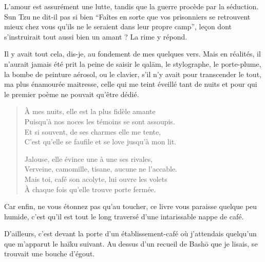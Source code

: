 {  L’amour est assurément une lutte, tandis que la guerre procède par la séduction. Sun Tzu ne dit-il pas si bien \enquote{Faîtes en sorte que vos prisonniers se retrouvent mieux chez vous qu’ils ne le seraient dans leur propre camp}, leçon dont s’instruirait tout aussi bien un amant ? La rime y répond.

  Il y avait tout cela, dis-je, au fondement de mes quelques vers. Mais en réalités, il n’aurait jamais été prit la peine de saisir le qalām, le stylographe, le porte-plume, la bombe de peinture aérosol, ou le clavier, s’il n’y avait pour transcender le tout, ma plus énamourée maitresse, celle qui me teint éveillé tant de nuits et pour qui le premier poème ne pouvait qu’être dédié.
}

\begin{verse}\quatrain
  À mes nuits, elle est la plus fidèle amante\\ 
  Puisqu’à nos noces les témoins se sont assoupis.\\ 
  Et si souvent, de ses charmes elle me tente,\\ 
  C’est qu’elle se faufile et se love jusqu’à mon lit. 

  Jalouse, elle évince une à une ses rivales,\\ 
  Verveine, camomille, tisane, aucune ne l’accable.\\ 
  Mais toi, café son acolyte, lui ouvre les volets\\ 
  À chaque fois qu’elle trouve porte fermée.  %
\end{verse}

\begin{prose}
  Car enfin, ne vous étonnez pas qu’au toucher, ce livre vous paraisse quelque peu humide, c’est qu’il est tout le long traversé d’une intarissable nappe de café.
\end{prose}

\begin{prose}
  D’ailleurs, c’est devant la porte d’un établissement-café où j’attendais quelqu’un que m’apparut le haïku suivant. Au dessus d’un recueil de Bashō que je lisais, se trouvait une bouche d’égout.
\end{prose}

